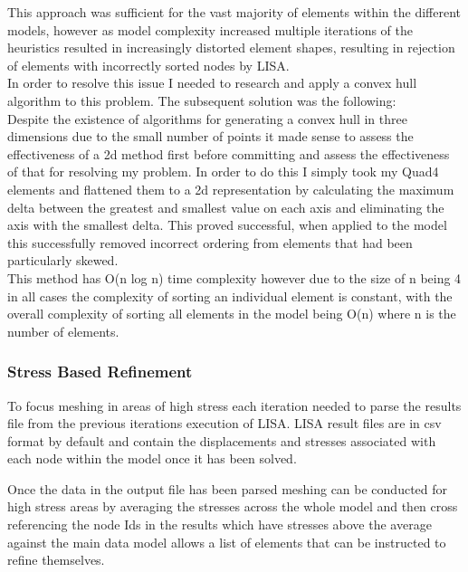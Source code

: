 \documentclass{article}
\begin{document}
\noindent
This approach was sufficient for the vast majority of elements within the different models, however as model complexity increased multiple iterations of the heuristics resulted in increasingly distorted element shapes, resulting in rejection of elements with incorrectly sorted nodes by LISA. \\
 
\noindent
In order to resolve this issue I needed to research and apply a convex hull algorithm to this problem. The subsequent solution was the following: \\ 


\noindent
Despite the existence of algorithms for generating a convex hull in three dimensions due to the small number of points it made sense to assess the effectiveness of a 2d method first before committing and assess the effectiveness of that for resolving my problem. In order to do this I simply took my Quad4 elements and flattened them to a 2d representation by calculating the maximum delta between the greatest and smallest value on each axis and eliminating the axis with the smallest delta. This proved successful, when applied to the model this successfully removed incorrect ordering from elements that had been particularly skewed. \\ 
	

\noindent
This method has O(n log n) time complexity however due to the size of n being 4 in all cases the complexity of sorting an individual element is constant, with the overall complexity of sorting all elements in the model being O(n) where n is the number of elements.


\subsubsection{Stress Based Refinement}
To focus meshing in areas of high stress each iteration needed to parse the results file from the previous iterations execution of LISA. LISA result files are in csv format by default and contain the displacements and stresses associated with each node within the model once it has been solved.

Once the data in the output file has been parsed meshing can be conducted for high stress areas by averaging the stresses across the whole model and then cross referencing the node Ids in the results which have stresses above the average against the main data model allows a list of elements that can be instructed to refine themselves.
\end{document}
